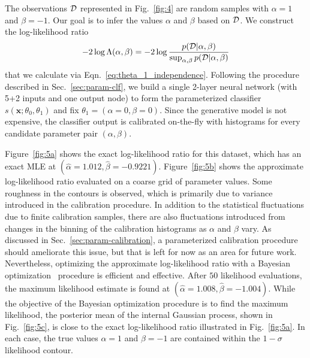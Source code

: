 \documentclass[12pt]{article}
\numberwithin{equation}{section}
\theoremstyle{plain}
\begin{document}
The observations ${\cal D}$ represented in Fig.~\ref{fig:4}
are random samples with $\alpha=1$ and $\beta=-1$.
Our goal is to infer the values $\alpha$ and $\beta$ based on ${\cal D}$.
We construct the log-likelihood ratio
\begin{equation}\label{eqn:obj-ex2}
    -2 \log \Lambda(\alpha, \beta ) = -2 \log \frac{p({\cal D} | \alpha, \beta)}{ \sup_{\alpha,\beta} p({\cal D} | \alpha, \beta) }
\end{equation}
that we calculate via Eqn.~\ref{eq:theta_1_independence}.
Following the procedure described in Sec.~\ref{sec:param-clf}, we
build a single 2-layer neural network (with 5+2 inputs and one output node) to form the parameterized classifier $s(\mathbf{x}; \theta_0, \theta_1)$ and fix $\theta_1=(\alpha=0, \beta=0)$.
Since the generative model is not expensive, the classifier output is calibrated
on-the-fly with histograms for  every candidate parameter pair $(\alpha,\beta)$.

Figure~\ref{fig:5a} shows the exact log-likelihood ratio for this dataset, which has an exact MLE at $(\hat \alpha=1.012, \hat \beta=-0.9221)$.
Figure~\ref{fig:5b} shows the approximate log-likelihood ratio evaluated on a coarse grid of parameter values. Some roughness in the contours is observed, which is primarily due to variance introduced in the calibration procedure. In addition to the statistical fluctuations due to finite calibration samples, there are also fluctuations introduced from changes in the binning of the calibration histograms as $\alpha$ and $\beta$ vary. As discussed in Sec.~\ref{sec:param-calibration}, a parameterized calibration
procedure should ameliorate this issue, but that is left for now as an area for future work.
Nevertheless, optimizing the approximate log-likelihood ratio with
a Bayesian optimization~\citep{brochu2010tutorial,gpy2014} procedure is efficient and effective.
After $50$ likelihood evaluations, the maximum likelihood estimate is found at $(\hat \alpha=1.008, \hat \beta=-1.004)$.
While the objective of the Bayesian optimization procedure is to find the maximum likelihood, the posterior mean of the
internal Gaussian process, shown in Fig.~\ref{fig:5c}, is close to the exact log-likelihood ratio illustrated in Fig.~\ref{fig:5a}.
In each case, the true values $\alpha=1$ and $\beta=-1$ are contained within the $1-\sigma$ likelihood contour.
\end{document}
